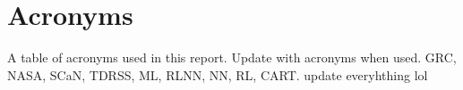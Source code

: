 

\chapter*{Acronyms}
\printnomenclature
A table of acronyms used in this report. Update with acronyms when used.
GRC, NASA, SCaN, TDRSS, ML, RLNN, NN, RL, CART.
update everyhthing lol
